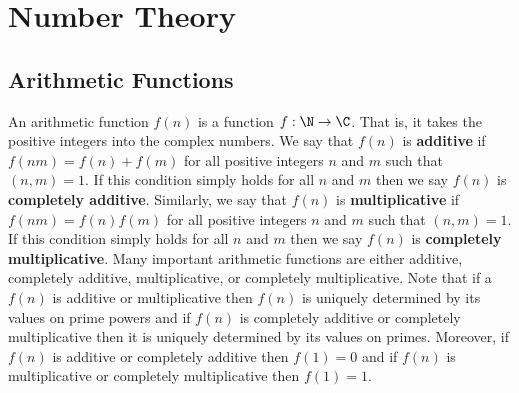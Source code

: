 \appendix
\chapter{Number Theory}
  \section{Arithmetic Functions}\label{append:Arithmetic_Functions}
    An arithmetic function $f(n)$ is a function $f:\N \to \C$. That is, it takes the positive integers into the complex numbers. We say that $f(n)$ is \textbf{additive} if $f(nm) = f(n)+f(m)$ for all positive integers $n$ and $m$ such that $(n,m) = 1$. If this condition simply holds for all $n$ and $m$ then we say $f(n)$ is \textbf{completely additive}. Similarly, we say that $f(n)$ is \textbf{multiplicative} if $f(nm) = f(n)f(m)$ for all positive integers $n$ and $m$ such that $(n,m) = 1$. If this condition simply holds for all $n$ and $m$ then we say $f(n)$ is \textbf{completely multiplicative}. Many important arithmetic functions are either additive, completely additive, multiplicative, or completely multiplicative. Note that if a $f(n)$ is additive or multiplicative then $f(n)$ is uniquely determined by its values on prime powers and if $f(n)$ is completely additive or completely multiplicative then it is uniquely determined by its values on primes. Moreover, if $f(n)$ is additive or completely additive then $f(1) = 0$ and if $f(n)$ is multiplicative or completely multiplicative then $f(1) = 1$.

